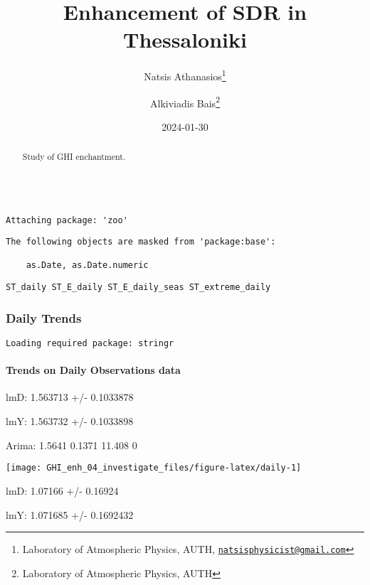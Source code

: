 \documentclass[
  10pt,
  a4paper,oneside]{article}
\title{Enhancement of SDR in Thessaloniki}
\author{Natsis Athanasios\footnote{Laboratory of Atmospheric Physics, AUTH, \href{mailto:natsisphysicist@gmail.com}{\nolinkurl{natsisphysicist@gmail.com}}} \and Alkiviadis Bais\footnote{Laboratory of Atmospheric Physics, AUTH}}
\date{2024-01-30}
\begin{document}
\maketitle
\begin{abstract}
Study of GHI enchantment.
\end{abstract}

{
\hypersetup{linkcolor=}
\setcounter{tocdepth}{4}
\tableofcontents
}
\begin{verbatim}

Attaching package: 'zoo'
\end{verbatim}

\begin{verbatim}
The following objects are masked from 'package:base':

    as.Date, as.Date.numeric
\end{verbatim}

\begin{verbatim}
ST_daily ST_E_daily ST_E_daily_seas ST_extreme_daily
\end{verbatim}

\newpage
\FloatBarrier

\hypertarget{daily-trends}{%
\subsubsection{Daily Trends}\label{daily-trends}}

\newpage

\begin{verbatim}
Loading required package: stringr
\end{verbatim}

\hypertarget{trends-on-daily-observations-data}{%
\paragraph{Trends on Daily Observations data}\label{trends-on-daily-observations-data}}

lmD: 1.563713 +/- 0.1033878

lmY: 1.563732 +/- 0.1033898

Arima: 1.5641 0.1371 11.408 0

\begin{center}\texttt{[image: GHI\_enh\_04\_investigate\_files/figure-latex/daily-1]} \end{center}

lmD: 1.07166 +/- 0.16924

lmY: 1.071685 +/- 0.1692432
\end{document}
